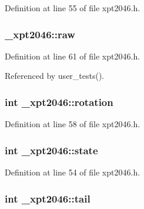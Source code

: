 Definition at line 55 of file xpt2046.\+h.

\subsubsection[{\texorpdfstring{raw}{raw}}]{ \+\_\+xpt2046\+::raw}\hypertarget{struct__xpt2046_a167dbfd40e17aadb4c0edd901db7e118}{}\label{struct__xpt2046_a167dbfd40e17aadb4c0edd901db7e118}


Definition at line 61 of file xpt2046.\+h.



Referenced by user\+\_\+tests().

\subsubsection[{\texorpdfstring{rotation}{rotation}}]{\setlength{\rightskip}{0pt plus 5cm}int \+\_\+xpt2046\+::rotation}\hypertarget{struct__xpt2046_a9730fbc57085ba0f27bf5563fbbce98b}{}\label{struct__xpt2046_a9730fbc57085ba0f27bf5563fbbce98b}


Definition at line 58 of file xpt2046.\+h.

\subsubsection[{\texorpdfstring{state}{state}}]{\setlength{\rightskip}{0pt plus 5cm}int \+\_\+xpt2046\+::state}\hypertarget{struct__xpt2046_a271e59b1fe899e8d1199f617bd381b15}{}\label{struct__xpt2046_a271e59b1fe899e8d1199f617bd381b15}


Definition at line 54 of file xpt2046.\+h.

\subsubsection[{\texorpdfstring{tail}{tail}}]{\setlength{\rightskip}{0pt plus 5cm}int \+\_\+xpt2046\+::tail}\hypertarget{struct__xpt2046_a22287733194e6d32116347f39f77523f}{}\label{struct__xpt2046_a22287733194e6d32116347f39f77523f}


